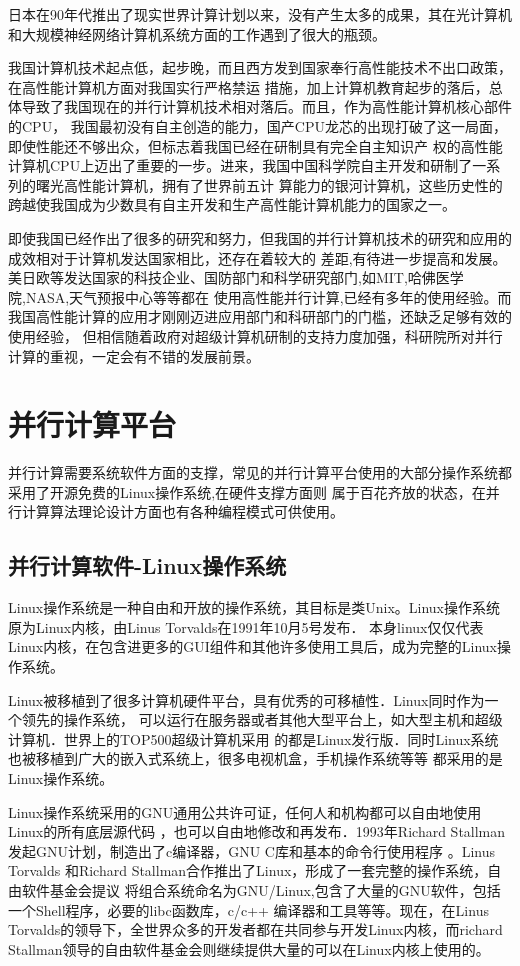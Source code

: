     日本在90年代推出了现实世界计算计划以来，没有产生太多的成果，其在光计算机和大规模神经网络计算机系统方面的工作遇到了很大的瓶颈。


    我国计算机技术起点低，起步晚，而且西方发到国家奉行高性能技术不出口政策，在高性能计算机方面对我国实行严格禁运
措施，加上计算机教育起步的落后，总体导致了我国现在的并行计算机技术相对落后。而且，作为高性能计算机核心部件的CPU，
我国最初没有自主创造的能力，国产CPU龙芯的出现打破了这一局面，即使性能还不够出众，但标志着我国已经在研制具有完全自主知识产
权的高性能计算机CPU上迈出了重要的一步。进来，我国中国科学院自主开发和研制了一系列的曙光高性能计算机，拥有了世界前五计
算能力的银河计算机，这些历史性的跨越使我国成为少数具有自主开发和生产高性能计算机能力的国家之一。

    即使我国已经作出了很多的研究和努力，但我国的并行计算机技术的研究和应用的成效相对于计算机发达国家相比，还存在着较大的
差距,有待进一步提高和发展。美日欧等发达国家的科技企业、国防部门和科学研究部门,如MIT,哈佛医学院,NASA,天气预报中心等等都在
使用高性能并行计算,已经有多年的使用经验。而我国高性能计算的应用才刚刚迈进应用部门和科研部门的门槛，还缺乏足够有效的使用经验，
但相信随着政府对超级计算机研制的支持力度加强，科研院所对并行计算的重视，一定会有不错的发展前景\cite{Zhangzhihong}。

\section{并行计算平台}
    并行计算需要系统软件方面的支撑，常见的并行计算平台使用的大部分操作系统都采用了开源免费的Linux操作系统,在硬件支撑方面则
属于百花齐放的状态，在并行计算算法理论设计方面也有各种编程模式可供使用。

\subsection{并行计算软件-Linux操作系统}
    Linux操作系统是一种自由和开放的操作系统，其目标是类Unix。Linux操作系统原为Linux内核，由Linus Torvalds在1991年10月5号发布．
本身linux仅仅代表Linux内核，在包含进更多的GUI组件和其他许多使用工具后，成为完整的Linux操作系统。

    Linux被移植到了很多计算机硬件平台，具有优秀的可移植性．Linux同时作为一个领先的操作系统，
可以运行在服务器或者其他大型平台上，如大型主机和超级计算机．世界上的TOP500超级计算机采用
的都是Linux发行版．同时Linux系统也被移植到广大的嵌入式系统上，很多电视机盒，手机操作系统等等
都采用的是Linux操作系统。

    Linux操作系统采用的GNU通用公共许可证，任何人和机构都可以自由地使用Linux的所有底层源代码
，也可以自由地修改和再发布．1993年Richard Stallman发起GNU计划，制造出了c编译器，GNU C库和基本的命令行使用程序
。Linus Torvalds 和Richard Stallman合作推出了Linux，形成了一套完整的操作系统，自由软件基金会提议
将组合系统命名为GNU/Linux,包含了大量的GNU软件，包括一个Shell程序，必要的libc函数库，c/c++
编译器和工具等等。现在，在Linus Torvalds的领导下，全世界众多的开发者都在共同参与开发Linux内核，而richard 
Stallman领导的自由软件基金会则继续提供大量的可以在Linux内核上使用的。

